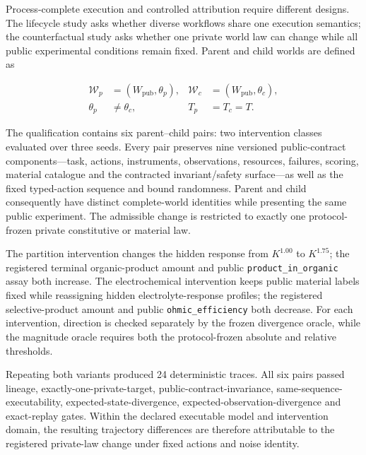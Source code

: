 \documentclass[10pt,twocolumn]{article}
\begin{document}
Process-complete execution and controlled attribution require different
designs. The lifecycle study asks whether diverse workflows share one
execution semantics; the counterfactual study asks whether one private
world law can change while all public experimental conditions remain
fixed. Parent and child worlds are defined as

\[
\begin{aligned}
\mathcal{W}_{p}&=(W_{\mathrm{pub}},\theta_p),&
\mathcal{W}_{c}&=(W_{\mathrm{pub}},\theta_c),\\
\theta_p&\neq\theta_c,& T_p&=T_c=T.
\end{aligned}
\]

The qualification contains six parent--child pairs: two intervention
classes evaluated over three seeds. Every pair preserves nine versioned
public-contract components---task, actions, instruments, observations,
resources, failures, scoring, material catalogue and the contracted
invariant/safety surface---as well as the fixed typed-action sequence
and bound randomness. Parent and child consequently have distinct
complete-world identities while presenting the same public experiment.
The admissible change is restricted to exactly one protocol-frozen
private constitutive or material law.

The partition intervention changes the hidden response from \(K^{1.00}\)
to \(K^{1.75}\); the registered terminal organic-product amount and
public \texttt{product\_in\_organic} assay both increase. The
electrochemical intervention keeps public material labels fixed while
reassigning hidden electrolyte-response profiles; the registered
selective-product amount and public \texttt{ohmic\_efficiency} both
decrease. For each intervention, direction is checked separately by the
frozen divergence oracle, while the magnitude oracle requires both the
protocol-frozen absolute and relative thresholds.

Repeating both variants produced 24 deterministic traces. All six pairs
passed lineage, exactly-one-private-target, public-contract-invariance,
same-sequence-executability, expected-state-divergence,
expected-observation-divergence and exact-replay gates. Within the
declared executable model and intervention domain, the resulting
trajectory differences are therefore attributable to the registered
private-law change under fixed actions and noise identity.
\end{document}
